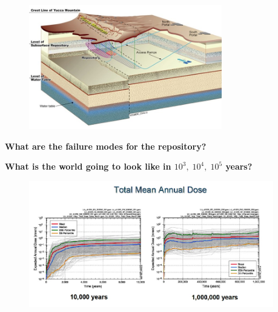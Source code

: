 \documentclass[aspectratio=1610,pdftex,dvipsnames,compress,xcolor={dvipsnames}]{beamer}
\begin{document}
\begin{frame}{}
    \begin{figure}
        \centering
        \includegraphics[width=0.75\textwidth]{yucca.geology.jpg}
    \end{figure}
\end{frame}


\begin{frame}[plain]{}
    \centering\LARGE\textbf{What are the failure modes for the repository?}
\end{frame}


\begin{frame}[plain]{}
    \centering\Large\textbf{What is the world going to look like in $10^3, \; 10^4, \; 10^5$ years?}
\end{frame}


\addtocounter{framenumber}{-2} 
\begin{frame}{}
    \begin{figure}
        \centering
        \includegraphics[width=0.95\textwidth]{yucca.mountain.jpg}
    \end{figure}
\end{frame}
\end{document}
